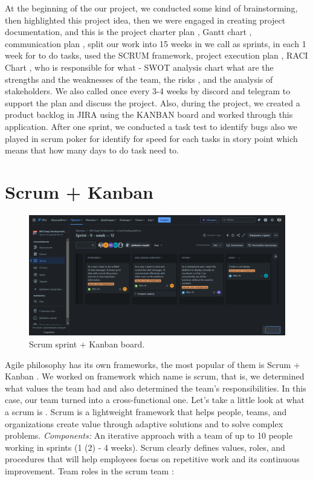 At the beginning of the our project, we conducted some kind of brainstorming, then highlighted this project idea, then we were engaged in creating project documentation, and this is the project charter plan \cite{projectcharter}, Gantt chart \cite{gantChart}, communication plan \cite{communicationplant}, split our work into 15 weeks in we call as sprints, in each 1 week for to do tasks, used the SCRUM \cite{scrumguide} framework, project execution plan \cite{executionplan}, RACI Chart \cite{racichart}, who is responsible for what - SWOT analysis chart \cite{swotanalyse} what are the strengths and the weaknesses of the team, the risks \cite{risksanalyse}, and the analysis of stakeholders. We also called once every 3-4 weeks by discord \cite{discord} and telegram \cite{telegram} to support the plan and discuss the project. Also, during the project, we created a product backlog in JIRA using the KANBAN board \cite{jira} and worked through this application. After one sprint, we conducted a task test to identify bugs also we played in scrum poker for identify for speed for each tasks in story point which means that how many days to do task need to.

\section{Scrum + Kanban}\label{scrmkan}
\begin{figure}[ht]\label{fig:kanbanboard}
  \centering
  \includegraphics[width=0.8\linewidth]{figures/Kanban board.png}
  \caption{Scrum sprint + Kanban board.}
\end{figure}

Agile philosophy \cite{agile} has its own frameworks, the most popular of them is Scrum + Kanban \cite{jira}. We worked on framework which name is scrum, that is, we determined what values the team had and also determined the team's responsibilities. In this case, our team turned into a cross-functional one. Let's take a little look at what a scrum is \cite{scrumguide}. Scrum is a lightweight framework that helps people, teams, and organizations create value through adaptive solutions and to solve complex problems. \textit{Components:} An iterative approach with a team of up to 10 people working in sprints (1 (2) - 4 weeks). Scrum clearly defines values, roles, and procedures that will help employees focus on repetitive work and its continuous improvement.
\newpage
Team roles in the scrum team \cite{scrumguide}:

